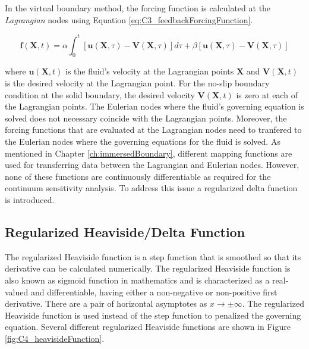 In the virtual boundary method, the forcing function is calculated at the \emph{Lagrangian} nodes using Equation \eqref{eq:C3_feedbackForcingFunction}.

\begin{equation}\label{eq:C3_feedbackForcingFunction}
	\mathbf{f}(\mathbf{X}, t) = 
	\alpha \int_0^t \left[ \mathbf{u}(\mathbf{X}, \tau) - \mathbf{V}(\mathbf{X}, \tau) \right] d\tau + 
	\beta \left[ \mathbf{u}(\mathbf{X}, \tau) - \mathbf{V}(\mathbf{X}, \tau) \right]
\end{equation}

where $\mathbf{u}(\mathbf{X}, t)$ is the fluid's velocity at the Lagrangian points $\mathbf{X}$ and $\mathbf{V}(\mathbf{X}, t)$ is the desired velocity at the Lagrangian point. For the no-slip boundary condition at the solid boundary, the desired velocity $\mathbf{V}(\mathbf{X}, t)$ is zero at each of the Lagrangian points. The Eulerian nodes where the fluid's governing equation is solved does not necessary coincide with the Lagrangian points. Moreover, the forcing functions that are evaluated at the Lagrangian nodes need to tranfered to the Eulerian nodes where the governing equations for the fluid is solved. As mentioned in Chapter \ref{ch:immersedBoundary}, different mapping functions are used for transferring data between the Lagrangian and Eulerian nodes. However, none of these functions are continuously differentiable as required for the continuum sensitivity analysis. To address this issue a regularized delta function is introduced.

\subsection{Regularized Heaviside/Delta Function}
The regularized Heaviside function is a step function that is smoothed so that its derivative can be calculated numerically. The regularized Heaviside function is also known as sigmoid function in mathematics and is characterized as a real-valued and differentiable, having either a non-negative or non-positive first derivative. There are a pair of horizontal asymptotes as $x \rightarrow \pm \infty$. The regularized Heaviside function is used instead of the step function to penalized the governing equation.  Several different regularized Heaviside functions are shown in Figure \ref{fig:C4_heavisideFunction}.

